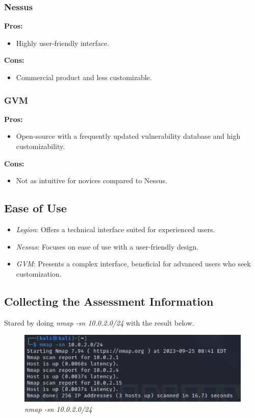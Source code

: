 \subsubsection*{Nessus}
\textbf{Pros:}
\begin{itemize}
    \item Highly user-friendly interface.
\end{itemize}
\textbf{Cons:}
\begin{itemize}
    \item Commercial product and less customizable.
\end{itemize}

\subsubsection*{GVM}
\textbf{Pros:}
\begin{itemize}
    \item Open-source with a frequently updated vulnerability database and high customizability.
\end{itemize}
\textbf{Cons:}
\begin{itemize}
    \item Not as intuitive for novices compared to Nessus.
\end{itemize}

\subsection*{Ease of Use}
\begin{itemize}
    \item \textit{Legion}: Offers a technical interface suited for experienced users.
    \item \textit{Nessus}: Focuses on ease of use with a user-friendly design.
    \item \textit{GVM}: Presents a complex interface, beneficial for advanced users who seek customization.
\end{itemize}







\subsection{Collecting the Assessment Information}
Stared by doing \textit{nmap -sn 10.0.2.0/24} with the result below.

\begin{figure}[H]
    \centering
    \includegraphics[width=0.7\linewidth]{pic/nmap sn.png}
    \caption{\textit{nmap -sn 10.0.2.0/24}}
    \label{fig:nmap sn}
\end{figure}

